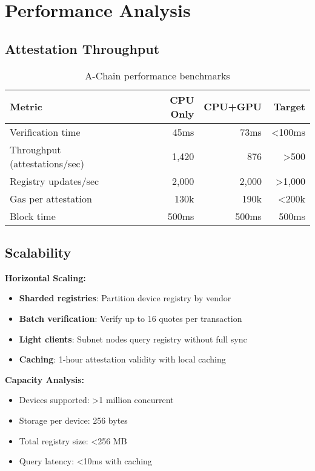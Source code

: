 \documentclass[11pt,a4paper]{article}
\begin{document}
\section{Performance Analysis}

\subsection{Attestation Throughput}

\begin{table}[h]
\centering
\begin{tabular}{@{}lrrr@{}}
\toprule
\textbf{Metric} & \textbf{CPU Only} & \textbf{CPU+GPU} & \textbf{Target} \\ \midrule
Verification time & 45ms & 73ms & <100ms \\
Throughput (attestations/sec) & 1,420 & 876 & >500 \\
Registry updates/sec & 2,000 & 2,000 & >1,000 \\
Gas per attestation & 130k & 190k & <200k \\
Block time & 500ms & 500ms & 500ms \\ \bottomrule
\end{tabular}
\caption{A-Chain performance benchmarks}
\end{table}

\subsection{Scalability}

\textbf{Horizontal Scaling:}
\begin{itemize}
\item \textbf{Sharded registries}: Partition device registry by vendor
\item \textbf{Batch verification}: Verify up to 16 quotes per transaction
\item \textbf{Light clients}: Subnet nodes query registry without full sync
\item \textbf{Caching}: 1-hour attestation validity with local caching
\end{itemize}

\textbf{Capacity Analysis:}
\begin{itemize}
\item Devices supported: >1 million concurrent
\item Storage per device: 256 bytes
\item Total registry size: <256 MB
\item Query latency: <10ms with caching
\end{itemize}
\end{document}
